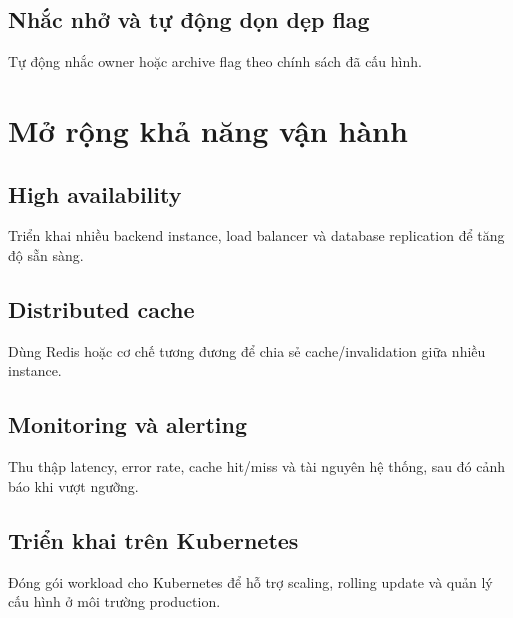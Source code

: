 \subsection{Nhắc nhở và tự động dọn dẹp flag}

Tự động nhắc owner hoặc archive flag theo chính sách đã cấu hình.

\section{Mở rộng khả năng vận hành}

\subsection{High availability}

Triển khai nhiều backend instance, load balancer và database replication để tăng độ sẵn sàng.

\subsection{Distributed cache}

Dùng Redis hoặc cơ chế tương đương để chia sẻ cache/invalidation giữa nhiều instance.

\subsection{Monitoring và alerting}

Thu thập latency, error rate, cache hit/miss và tài nguyên hệ thống, sau đó cảnh báo khi vượt ngưỡng.

\subsection{Triển khai trên Kubernetes}

Đóng gói workload cho Kubernetes để hỗ trợ scaling, rolling update và quản lý cấu hình ở môi trường production.
